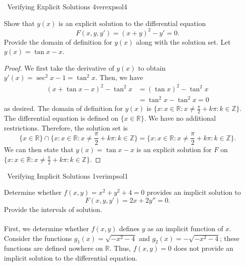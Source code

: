         \begin{example}{\Difficulty\,\Difficulty\,\,Verifying Explicit Solutions 4}{verexpsol4}
        
            Show that \(y(x)\) is an explicit solution to the differential equation
            \begin{equation*}
                F(x,y,y')=(x+y)^2-y'=0.
            \end{equation*}
            Provide the domain of definition for \(y(x)\) along with the solution set. Let \(y(x)=\tan x-x\).
            \begin{proof}
                We first take the derivative of \(y(x)\) to obtain \(y'(x)=\sec^2x-1=\tan^2x\). Then, we have
                \begin{align*}
                    (x+\tan x-x)^2-\tan^2x&=(\tan x)^2-\tan^2x \\
                    &=\tan^2x-\tan^2x=0
                \end{align*}
                as desired. The domain of definition for \(y(x)\) is \(\{x:x\in \mathbb{R}:x\neq \frac{\pi}{2}+k\pi:k\in\mathbb{Z}\}\). The differential equation is defined on \(\{x\in\mathbb{R}\}\). We have no additional restrictions. Therefore, the solution set is 
                \begin{equation*}
                    \{x\in\mathbb{R}\}\cap\{x:x\in \mathbb{R}:x\neq \frac{\pi}{2}+k\pi:k\in\mathbb{Z}\}=\{x:x\in \mathbb{R}:x\neq \frac{\pi}{2}+k\pi:k\in\mathbb{Z}\}.
                \end{equation*}
                We can then state that \(y(x)=\tan x-x\) is an explicit solution for \(F\) on \(\{x:x\in \mathbb{R}:x\neq \frac{\pi}{2}+k\pi:k\in\mathbb{Z}\}\).
            \end{proof}

        \end{example}
        \begin{example}{\Difficulty\,\Difficulty\,\,Verifying Implicit Solutions 1}{verimpsol1}
            
            Determine whether \(f(x,y)=x^2+y^2+4=0\) provides an implicit solution to
            \begin{equation*}
                F(x,y,y')=2x+2y''=0.
            \end{equation*}
            Provide the intervals of solution.
            \\
            \\
            First, we determine whether \(f(x,y)\) defines \(y\) as an implicit function of \(x\). Consider the functions \(g_1(x)=\sqrt{-x^2-4}\) and \(g_2(x)=-\sqrt{-x^2-4}\); these functions are defined nowhere on \(\mathbb{R}\). Thus, \(f(x,y)=0\) does not provide an implicit solution to the differential equation.

        \end{example}

